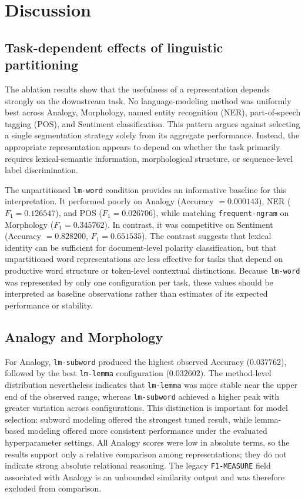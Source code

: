 \section{Discussion}
\label{sec:discussion}

\subsection{Task-dependent effects of linguistic partitioning}

The ablation results show that the usefulness of a representation depends
strongly on the downstream task. No language-modeling method was uniformly
best across Analogy, Morphology, named entity recognition (NER),
part-of-speech tagging (POS), and Sentiment classification. This pattern
argues against selecting a single segmentation strategy solely from its
aggregate performance. Instead, the appropriate representation appears to
depend on whether the task primarily requires lexical-semantic information,
morphological structure, or sequence-level label discrimination.

The unpartitioned \texttt{lm-word} condition provides an informative baseline
for this interpretation. It performed poorly on Analogy
(Accuracy $=0.000143$), NER ($F_1=0.126547$), and POS
($F_1=0.026706$), while matching \texttt{frequent-ngram} on Morphology
($F_1=0.345762$). In contrast, it was competitive on Sentiment
(Accuracy $=0.828200$, $F_1=0.651535$). The contrast suggests that lexical
identity can be sufficient for document-level polarity classification, but
that unpartitioned word representations are less effective for tasks that
depend on productive word structure or token-level contextual distinctions.
Because \texttt{lm-word} was represented by only one configuration per task,
these values should be interpreted as baseline observations rather than
estimates of its expected performance or stability.

\subsection{Analogy and Morphology}

For Analogy, \texttt{lm-subword} produced the highest observed Accuracy
($0.037762$), followed by the best \texttt{lm-lemma} configuration
($0.032602$). The method-level distribution nevertheless indicates that
\texttt{lm-lemma} was more stable near the upper end of the observed range,
whereas \texttt{lm-subword} achieved a higher peak with greater variation
across configurations. This distinction is important for model selection:
subword modeling offered the strongest tuned result, while lemma-based
modeling offered more consistent performance under the evaluated
hyperparameter settings. All Analogy scores were low in absolute terms, so
the results support only a relative comparison among representations; they do
not indicate strong absolute relational reasoning. The legacy
\texttt{F1-MEASURE} field associated with Analogy is an unbounded similarity
output and was therefore excluded from comparison.

